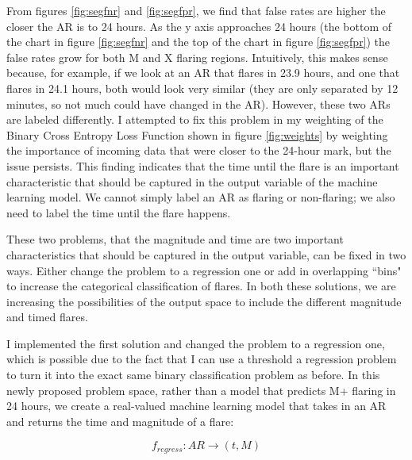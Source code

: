 \documentclass[defaultstyle,11pt]{thesis}
\begin{document}
From figures \ref{fig:segfnr} and \ref{fig:segfpr}, we find that false rates are higher the closer the AR is to 24 hours. As the y axis approaches 24 hours (the bottom of the chart in figure \ref{fig:segfnr} and the top of the chart in figure \ref{fig:segfpr}) the false rates grow for both M and X flaring regions. Intuitively, this makes sense because, for example, if we look at an AR that flares in 23.9 hours, and one that flares in 24.1 hours, both would look very similar (they are only separated by 12 minutes, so not much could have changed in the AR). However, these two ARs are labeled differently. I attempted to fix this problem in my weighting of the Binary Cross Entropy Loss Function shown in figure \ref{fig:weights} by weighting the importance of incoming data that were closer to the 24-hour mark, but the issue persists. This finding indicates that the time until the flare is an important characteristic that should be captured in the output variable of the machine learning model. We cannot simply label an AR as flaring or non-flaring; we also need to label the time until the flare happens.

These two problems, that the magnitude and time are two important characteristics that should be captured in the output variable, can be fixed in two ways. Either change the problem to a regression one or add in overlapping ``bins" to increase the categorical classification of flares. In both these solutions, we are increasing the possibilities of the output space to include the different magnitude and timed flares. 

I implemented the first solution and changed the problem to a regression one, which is possible due to the fact that I can use a threshold a regression problem to turn it into the exact same binary classification problem as before. In this newly proposed problem space, rather than a model that predicts M+ flaring in 24 hours, we create a real-valued machine learning model that takes in an AR and returns the time and magnitude of a flare:

$$f_{regress} : AR \rightarrow (t, M)$$
\end{document}
